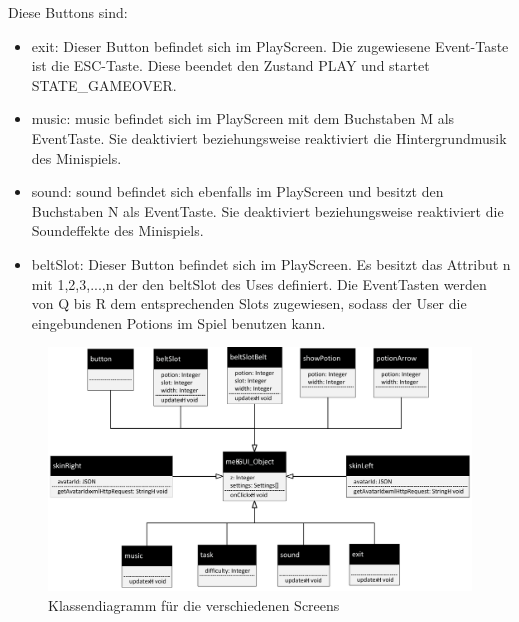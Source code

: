 Diese Buttons sind:
\begin{itemize} 
  	\item exit: Dieser Button befindet sich im PlayScreen. Die zugewiesene Event-Taste ist die ESC-Taste. Diese beendet den Zustand PLAY und startet STATE\_GAMEOVER.
  	\item music: music befindet sich im PlayScreen mit dem Buchstaben M als EventTaste. Sie deaktiviert beziehungsweise reaktiviert die Hintergrundmusik des Minispiels.
	\item sound: sound befindet sich ebenfalls im PlayScreen und besitzt den Buchstaben N als EventTaste. Sie deaktiviert beziehungsweise reaktiviert die Soundeffekte des Minispiels.
  	\item beltSlot: Dieser Button befindet sich im PlayScreen. Es besitzt das Attribut n mit 1,2,3,...,n der den beltSlot des Uses definiert. Die EventTasten
	werden von Q bis R dem entsprechenden Slots zugewiesen, sodass der User die eingebundenen Potions im Spiel benutzen kann.
\end{itemize} 

\newpage
\begin{figure}[ht]
\centering
\includegraphics[width=1.0\textwidth]{figures/KlassendiagrammButtons.pdf}
\caption{Klassendiagramm für die verschiedenen Screens}
\label{MEgui}
\end{figure}    

\newpage
